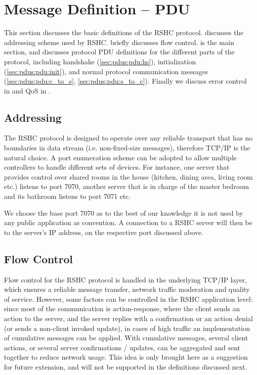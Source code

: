 \section{Message Definition -- PDU}
\label{sec:pdus}

This section discusses the basic definitions of the RSHC protocol.  discusses the addressing scheme used by RSHC.  briefly discusses flow control.  is the main section, and discusses protocol PDU definitions for the different parts of the protocol, including handshake (\ref{sec:pdus:pdu:hs}), initialization (\ref{sec:pdus:pdu:init}), and normal protocol communication messages (\ref{sec:pdus:pdu:c_to_s}, \ref{sec:pdus:pdu:s_to_c}). Finally we discuss error control in  and QoS in .

\subsection{Addressing}
\label{sec:pdus:addr}

The RSHC protocol is designed to operate over any reliable transport that has no boundaries in data stream (i.e. non-fixed-size messages), therefore TCP/IP is the natural choice. A port enumeration scheme can be adopted to allow multiple controllers to handle different sets of devices. For instance, one server that provides control over shared rooms in the house (kitchen, dining area, living room etc.) listens to port 7070, another server that is in charge of the master bedroom and its bathroom listens to port 7071 etc.

We choose the base port 7070 as to the best of our knowledge it is not used by any public application as convention. A connection to a RSHC server will then be to the server's IP address, on the respective port discussed above.

\subsection{Flow Control}
\label{sec:pdus:flow}

Flow control for the RSHC protocol is handled in the underlying TCP/IP layer, which ensures a reliable message transfer, network traffic moderation and quality of service. However, some factors can be controlled in the RSHC application level: since most of the communication is action-response, where the client sends an action to the server, and the server replies with a confirmation or an action denial (or sends a non-client invoked update), in cases of high traffic an implementation of cumulative messages can be applied. With cumulative messages, several client actions, or several server confirmations / updates, can be aggregated and sent together to reduce network usage. This idea is only brought here as a suggestion for future extension, and will not be supported in the definitions discussed next.


